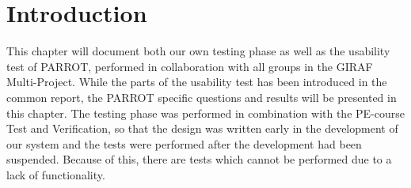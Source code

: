 \section{Introduction}
This chapter will document both our own testing phase as well as the usability test of PARROT, performed in collaboration with all groups in the GIRAF Multi-Project.
While the parts of the usability test has been introduced in the common report, the PARROT specific questions and results will be presented in this chapter.
The testing phase was performed in combination with the PE-course Test and Verification, so that the design was written early in the development of our system and the tests were performed after the development had been suspended.
Because of this, there are tests which cannot be performed due to a lack of functionality.